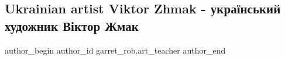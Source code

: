  
 
 
 
 

\subsection{Ukrainian artist Viktor Zhmak - український художник Віктор Жмак}
\label{sec:19_02_2023.fb.garret_rob.art_teacher.1.ukrainian_artist_vik}

\ifcmt
 author_begin
   author_id garret_rob.art_teacher
 author_end
\fi
